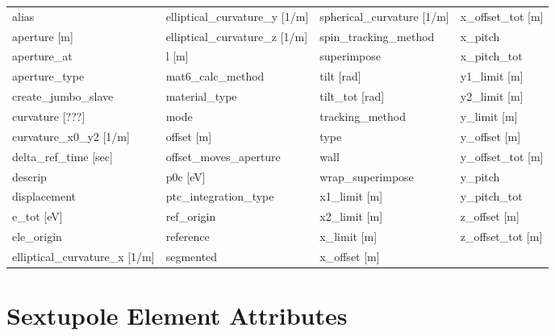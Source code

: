  \begin{tabular}{llll} \toprule
alias                            & elliptical_curvature_y [1/m]     & spherical_curvature [1/m]        & x_offset_tot [m]                 \\
aperture [m]                     & elliptical_curvature_z [1/m]     & spin_tracking_method             & x_pitch                          \\
aperture_at                      & l [m]                            & superimpose                      & x_pitch_tot                      \\
aperture_type                    & mat6_calc_method                 & tilt [rad]                       & y1_limit [m]                     \\
create_jumbo_slave               & material_type                    & tilt_tot [rad]                   & y2_limit [m]                     \\
curvature [???]                  & mode                             & tracking_method                  & y_limit [m]                      \\
curvature_x0_y2 [1/m]            & offset [m]                       & type                             & y_offset [m]                     \\
delta_ref_time [sec]             & offset_moves_aperture            & wall                             & y_offset_tot [m]                 \\
descrip                          & p0c [eV]                         & wrap_superimpose                 & y_pitch                          \\
displacement                     & ptc_integration_type             & x1_limit [m]                     & y_pitch_tot                      \\
e_tot [eV]                       & ref_origin                       & x2_limit [m]                     & z_offset [m]                     \\
ele_origin                       & reference                        & x_limit [m]                      & z_offset_tot [m]                 \\
elliptical_curvature_x [1/m]     & segmented                        & x_offset [m]                     &                                  \\
 \bottomrule
 \end{tabular}
 \vfill
 
 \section{Sextupole Element Attributes}
 \label{s:list.sextupole}
 
